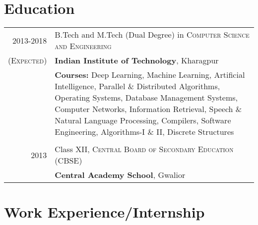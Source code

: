 \documentclass[a4paper,10pt]{extarticle} %
\begin{document}
\section{\large{Education}}

\begin{tabular}{r|p{16cm}}	
\normalsize{2013-2018} & \small{B.Tech and M.Tech (Dual Degree) in} \textsc{\small{Computer Science and Engineering}}\\
\textsc{\normalsize{(Expected)}}&\small{\textbf{Indian Institute of Technology}, Kharagpur}\\
&\textbf{Courses: }\small{{Deep Learning, Machine Learning, Artificial Intelligence, Parallel \& Distributed Algorithms, Operating Systems, Database Management Systems, Computer Networks, Information Retrieval, Speech \& Natural Language Processing, Compilers, Software Engineering, Algorithms-I \& II, Discrete Structures}}\\

\vspace{-7pt}
&\\
\normalsize{2013}& \small{Class XII,} \textsc{}\textsc{\small{Central Board of Secondary Education (CBSE)}} \\
&\small{\textbf{Central Academy School}, Gwalior}\\





\end{tabular}

\section{\large{Work Experience/Internship}}
\end{document}
